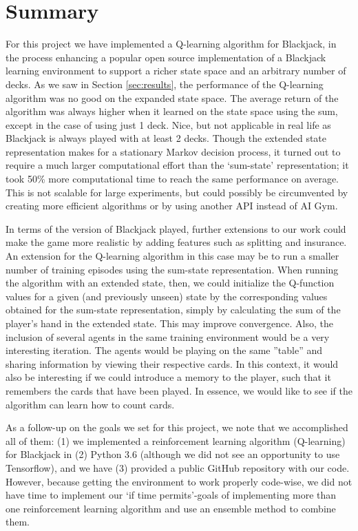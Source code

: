 \section{Summary} \label{sec:summary}
For this project we have implemented a Q-learning algorithm for Blackjack, in the process
enhancing a popular open source implementation of a Blackjack learning environment to
support a richer state space and an arbitrary number of decks. 
%
As we saw in Section \ref{sec:results}, the performance of the Q-learning algorithm was no 
good on the expanded state space. 
The average return of the algorithm was always higher when it learned on the state space using the sum,
except in the case of using just 1 deck. Nice, but not applicable in real life as Blackjack is always played
with at least 2 decks.
Though the extended state representation makes for a stationary Markov decision process, it turned out to require
a much larger computational effort than the `sum-state' representation;
it took 50\% more computational time to reach the same performance on average. This is not scalable for large experiments,
but could possibly be circumvented by creating more efficient 
algorithms or by using another API instead of AI Gym.

In terms of the version of Blackjack played,
further extensions to our work could make the game more realistic by adding features such
as splitting and insurance. An extension for the Q-learning algorithm in this case may be
to run a smaller number of training episodes using the sum-state representation.
When running the algorithm with an extended state, then, we could initialize the Q-function
values for a given (and previously unseen) state by the corresponding values obtained for
the sum-state representation, simply by calculating the sum of the player's hand in the
extended state. This may improve convergence.
%
Also, the inclusion of several agents in the same training environment would be a very interesting iteration.
The agents would be playing on the same ''table'' and sharing information by viewing their respective cards. In
this context, it would also be interesting if we could introduce a memory to the player, such that it remembers
the cards that have been played. In essence, we would like to see if the algorithm can learn how to count cards. 

As a follow-up on the goals we set for this project, we note that we accomplished all of
them: (1) we implemented a reinforcement learning algorithm (Q-learning) for Blackjack
in (2) Python 3.6 (although we did not see an opportunity to use Tensorflow), and
we have (3) provided a public GitHub repository with our code. However, because getting the 
environment to work properly code-wise, we did not have time to implement our `if time permits'-goals
of implementing more than one reinforcement learning algorithm and use an ensemble method to
combine them.
